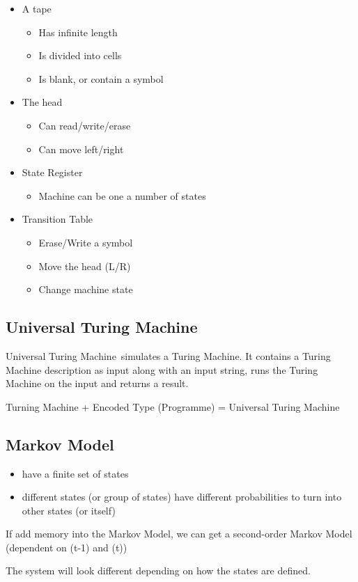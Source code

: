 \documentclass[a4paper, openany]{book}
\begin{document}
\begin{itemize}
  \item A tape
  \begin{itemize}
    \item Has infinite length
    \item Is divided into cells
    \item Is blank, or contain a symbol
  \end{itemize}
  \item The head
  \begin{itemize}
    \item Can read/write/erase
    \item Can move left/right
  \end{itemize}
  \item State Register
  \begin{itemize}
    \item Machine can be one a number of states
  \end{itemize}
  \item Transition Table
  \begin{itemize}
    \item Erase/Write a symbol
    \item Move the head (L/R)
    \item Change machine state
  \end{itemize}
\end{itemize}

\subsection{Universal Turing Machine}

Universal Turing Machine~simulates a Turing Machine. It contains a
Turing Machine description as input along with an input string, runs the
Turing Machine on the input and returns a result.

Turning Machine + Encoded Type (Programme) = Universal Turing Machine

\subsection{Markov Model}
\label{sec:markov-model}

\begin{itemize}
  \item have a finite set of states
  \item different states (or group of states) have different probabilities to
  turn into other states (or itself)
\end{itemize}

If add memory into the Markov Model, we can get a second-order Markov
Model (dependent on (t-1) and (t))

The system will look different depending on how the states are defined.
\end{document}
